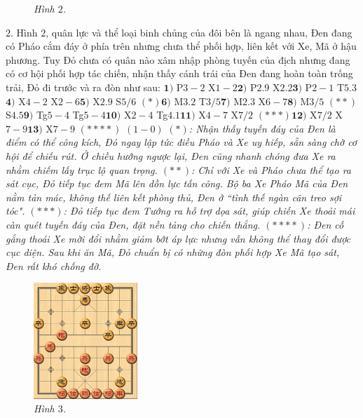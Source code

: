 \begin{multicols}{2}
\begin{figure}[H]
		\caption{\small\textit{\color{gocco}Hình $2$.}}
		\vspace*{-10pt}
	\end{figure}
	$2.$ Hình $2$, quân lực và thể loại binh chủng của đôi bên là ngang nhau, Đen đang có Pháo cắm đáy ở phía trên nhưng chưa thể phối hợp, liên kết với Xe, Mã ở hậu phương. Tuy Đỏ chưa có quân nào xâm nhập phòng tuyến của địch nhưng đang có cơ hội phối hợp tác chiến, nhận thấy cánh trái của Đen đang hoàn toàn trống trải, Đỏ đi trước và ra đòn như sau:
	\vskip 0.1cm
	$\pmb{1)}$ P$3-2$ X$1-2$\quad  $\pmb{2)}$ P$2.9$ X$2.2$\quad $\pmb{3)}$ P$2-1$ T$5.3$\quad $\pmb{4)}$ X$4-2$ X$2-6$\quad $\pmb{5)}$ X$2.9$ S$5/6$ $(*)$\quad $\pmb{6)}$ M$3.2$ T$3/5$\quad $\pmb{7)}$ M$2.3$ X$6-7$\quad  $\pmb{8)}$ M$3/5$ $(**)$ S$4.5$\quad $\pmb{9)}$ Tg$5-4$ Tg$5-4$\quad $\pmb{10)}$ X$2-4$ Tg$4.1$\quad $\pmb{11)}$ X$4-7$ X$7/2$ $(***)$\quad $\pmb{12)}$ X$7/2$ X$7-9$\quad $\pmb{13)}$ X$7-9$ $(****)$ $(1-0)$
	\vskip 0.1cm
	\textit{$(*)$: Nhận thấy tuyến đáy của Đen là điểm có thể công kích, Đỏ ngay lập tức điều Pháo và Xe uy hiếp, sẵn sàng chờ cơ hội để chiếu rút. Ở chiều hướng ngược lại, Đen cũng nhanh chóng đưa Xe ra nhằm chiếm lấy trục lộ quan trọng.
	\vskip 0.1cm
	$(**)$: Chỉ với Xe và Pháo chưa thể tạo ra sát cục, Đỏ tiếp tục đem Mã lên dồn lực tấn công. Bộ ba Xe Pháo Mã của Đen nằm tản mác, không thế liên kết phòng thủ, Đen ở ``tình thế ngàn cân treo sợi tóc".
	\vskip 0.1cm
	$(***)$: Đỏ tiếp tục đem Tướng ra hỗ trợ dọa sát, giúp chiến Xe thoải mái càn quét tuyến đáy của Đen, đặt nền tảng cho chiến thắng.
	\vskip 0.1cm
	$(****)$: Đen cố gắng thoái Xe mời đổi nhằm giảm bớt áp lực nhưng vẫn không thể thay đổi được cục diện. Sau khi ăn Mã, Đỏ chuẩn bị có những đòn phối hợp Xe Mã tạo sát, Đen rất khó chống đỡ.}
	\begin{figure}[H]
		\vspace*{-5pt}
		\centering
		\captionsetup{labelformat= empty, justification=centering}
		\includegraphics[width= 0.35\textwidth]{3}
		\caption{\small\textit{\color{gocco}Hình $3$.}}
		\vspace*{-10pt}

\end{figure}
\end{multicols}
